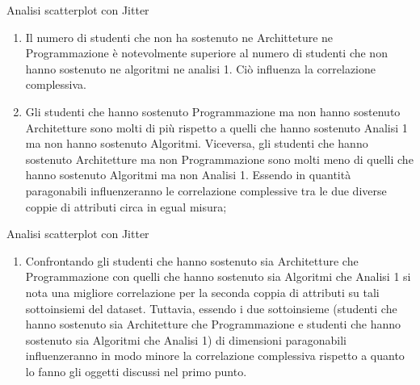\documentclass{beamer}
\begin{document}
  \begin{frame}{Analisi scatterplot con Jitter}
    \begin{enumerate}[-]
      \item Il numero di studenti che non ha sostenuto ne Architteture ne Program\-mazione è notevolmente superiore al numero di studenti che non hanno sostenuto ne algoritmi ne analisi 1. Ciò influenza la correlazione complessiva.
      \item Gli studenti che hanno sostenuto Programmazione ma non hanno sostenuto Architetture sono molti di più rispetto a quelli che hanno sostenuto Analisi 1 ma non hanno sostenuto Algoritmi. Viceversa, gli studenti che hanno sostenuto Architetture ma non Programmazione sono molti meno di quelli che hanno sostenuto Algoritmi ma non Analisi 1. Essendo in quantità paragonabili influenzeranno le correlazione complessive tra le due diverse coppie di attributi circa in egual misura;
    \end{enumerate}
  \end{frame}
  
  \begin{frame}{Analisi scatterplot con Jitter}
    \begin{enumerate}[-]
      \item Confrontando gli studenti che hanno sostenuto sia Architetture che Pro\-grammazione con quelli che hanno sostenuto sia Algoritmi che Analisi 1 si nota una migliore correlazione per la seconda coppia di attributi su tali sottoinsiemi del dataset. Tuttavia, essendo i due sottoinsieme (studenti che hanno sostenuto sia Architetture che Pro\-gramma\-zione e studenti che hanno sostenuto sia Algoritmi che Analisi 1) di dimensioni paragonabili influenzeranno in modo minore la corre\-lazione complessiva rispetto a quanto lo fanno gli oggetti discussi nel primo punto.
    \end{enumerate}
  \end{frame}
\end{document}
